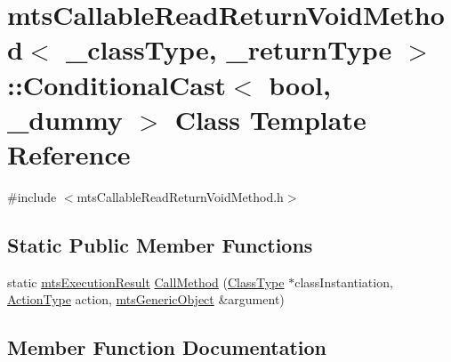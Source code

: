 \hypertarget{classmts_callable_read_return_void_method_1_1_conditional_cast}{}\section{mts\+Callable\+Read\+Return\+Void\+Method$<$ \+\_\+class\+Type, \+\_\+return\+Type $>$\+:\+:Conditional\+Cast$<$ bool, \+\_\+dummy $>$ Class Template Reference}
\label{classmts_callable_read_return_void_method_1_1_conditional_cast}


{\ttfamily \#include $<$mts\+Callable\+Read\+Return\+Void\+Method.\+h$>$}

\subsection*{Static Public Member Functions}
\begin{DoxyCompactItemize}
\item 
static \hyperlink{classmts_execution_result}{mts\+Execution\+Result} \hyperlink{classmts_callable_read_return_void_method_1_1_conditional_cast_a99e4807f8515f7509d9816f1da2901c1}{Call\+Method} (\hyperlink{classmts_callable_read_return_void_method_a694e26a4c7fc28f0c739aa2f2ab97e12}{Class\+Type} $\ast$class\+Instantiation, \hyperlink{classmts_callable_read_return_void_method_a97673cc9242251e406bde738cb060781}{Action\+Type} action, \hyperlink{classmts_generic_object}{mts\+Generic\+Object} \&argument)
\end{DoxyCompactItemize}


\subsection{Member Function Documentation}
\hypertarget{classmts_callable_read_return_void_method_1_1_conditional_cast_a99e4807f8515f7509d9816f1da2901c1}{}

